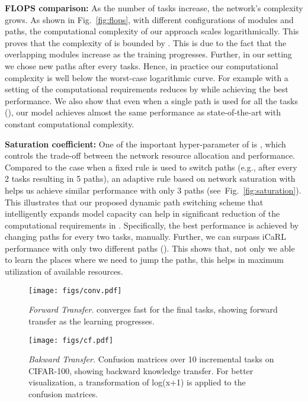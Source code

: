\textbf{FLOPS comparison:} As the number of tasks increase, the network's complexity grows. As shown in Fig.~\ref{fig:flops}, with different configurations of modules and paths, the computational complexity of our approach scales logarithmically. This proves that the complexity of \ours{} is bounded by  . This is due to the fact that the overlapping modules increase as the training progresses. Further, in our setting we chose new paths after every  tasks. Hence, in practice our computational complexity is well below the worst-case logarithmic curve. For example with a setting of  the computational requirements reduces by  while achieving the best performance. We also show that even when a single path is used for all the tasks (), our model achieves almost the same performance as state-of-the-art with constant computational complexity. 




\textbf{Saturation coefficient:}
One of the important hyper-parameter of \ours{} is , which controls the trade-off between the network resource allocation and performance. Compared to the case when a fixed rule is used to switch paths (e.g., after every 2 tasks resulting in 5 paths), an adaptive rule based on network saturation with  helps us achieve similar performance with only 3 paths (see~Fig.~\ref{fig:saturation}). This illustrates that our proposed dynamic path switching scheme that intelligently expands model capacity can help in significant reduction of the computational requirements in \ours{}. Specifically, the best performance is achieved by changing paths for every two tasks, manually. Further, we can surpass iCaRL~\cite{rebuffi2017icarl} performance with only two different paths (). This shows that, not only we able to learn the places where we need to jump the paths, this helps in maximum utilization of available resources. 

\begin{figure}[t]
\begin{center}
         \texttt{[image: figs/conv.pdf]}
\end{center}
\caption{\emph{Forward Transfer}. \ours{} converges fast for the final tasks, showing forward transfer as the learning progresses.}
\label{fig:conv}
\end{figure}

\begin{figure*}[t]
\center
\texttt{[image: figs/cf.pdf]}
\caption{\label{fig:cfmatrix} \emph{Bakward Transfer.} Confusion matrices  
over 10 incremental tasks on CIFAR-100, showing backward knowledge transfer. For better visualization, a transformation of log(x+1) is applied to the confusion matrices. }
\end{figure*}

